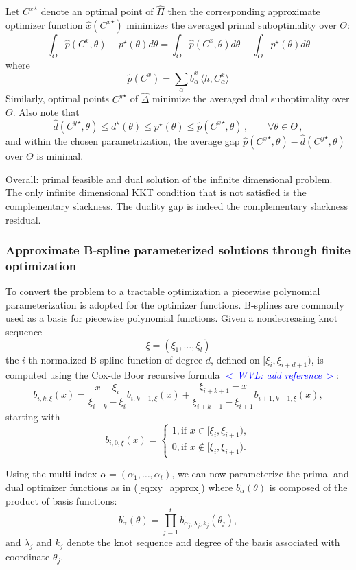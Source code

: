 \documentclass{article}
\newcommand{\ppar}{\theta}                  %
\newcommand{\Ppar}{\Theta}                  %
\newcommand{\commentWVL}[1]{\noindent \textcolor{blue}{\emph{$<\,$WVL: #1$\,>$}}}%
\begin{document}
Let ${C^x}^\star$ denote an optimal point of $\hat{\Pi}$ then the corresponding approximate optimizer function $\hat{x}({C^x}^\star)$ minimizes the averaged primal suboptimality over $\Ppar$:
\[ \int_{\Ppar}\hat{p}(C^x,\ppar)-p^\star(\ppar)d\ppar = \int_{\Ppar}\hat{p}(C^x,\ppar)d\ppar-\int_{\Ppar}p^\star(\ppar)d\ppar%
\]
where
\[ \hat{p}(C^x) = \sum_\alpha \bar{b}^x_\alpha \, \langle h, C^x_\alpha \rangle%
\]
Similarly, optimal points ${C^y}^\star$ of $\hat{\Delta}$ minimize the averaged dual suboptimality over $\Ppar$. Also note that
\[ \hat{d}({C^y}^\star,\ppar) \leq d^\star(\ppar) \leq p^\star(\ppar) \leq \hat{p}({C^x}^\star,\ppar)\,,\qquad\forall\ppar\in\Ppar\,,%
\]
and within the chosen parametrization, the average gap $\hat{p}({C^x}^\star,\ppar)-\hat{d}({C^y}^\star,\ppar)$ over $\Ppar$ is minimal.

Overall: primal feasible and dual solution of the infinite dimensional problem. The only infinite dimensional KKT condition that is not satisfied is the complementary slackness. The duality gap is indeed the complementary slackness residual.



\subsubsection*{Approximate B-spline parameterized solutions through finite optimization}%

To convert the problem to a tractable optimization a piecewise polynomial
parameterization is adopted for the optimizer functions. B-splines are commonly used as a basis for piecewise polynomial functions. Given a nondecreasing knot sequence
\[
\xi = (\xi_1, \ldots, \xi_l)
\]
the $i$-th normalized B-spline function of degree $d$, defined on $[\xi_i,
\xi_{i+d+1})$, is computed using the Cox-de Boor recursive formula
\commentWVL{add reference}:
\[
    b_{i,k,\xi}(x) = \frac{x-\xi_i}{\xi_{i+k} - \xi_i}
    b_{i,k-1,\xi}(x) +
    \frac{\xi_{i+k+1}-x}{\xi_{i+k+1} - \xi_{i+1}}
    b_{i+1,k-1,\xi}(x) ,
\]
starting with
\[
    b_{i,0,\xi}(x)  =
    \begin{cases}
        1 , \text{if } x \in [\xi_i , \xi_{i+1} ) , \\
        0, \text{if } x \notin [\xi_i , \xi_{i+1} ) .
    \end{cases}
\]

Using the multi-index $\alpha=(\alpha_1, \ldots, \alpha_t)$, we can now
parameterize the primal and dual optimizer functions as in (\ref{eq:xy_approx}) where $b_\alpha^\cdot(\ppar)$ is composed of the product of basis functions:
\[
b_\alpha^\cdot(\ppar) = \prod_{j=1}^t b^\cdot_{\alpha_j, \lambda_j,
k_j}(\ppar_j),
\]
and $\lambda_j$ and $k_j$ denote the knot sequence and degree of the basis
associated with coordinate $\ppar_j$.
\end{document}
